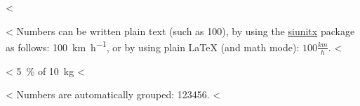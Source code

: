 <%

<%
Numbers can be written plain text (such as 100), by using the \href{https://ctan.org/pkg/siunitx}{siunitx} package as follows:
\SI{100}{\km\per\hour},
or by using plain \LaTeX{} (and math mode):
$100 \frac{\mathit{km}}{h}$.
<%

<%
\SI{5}{\percent} of \SI{10}{kg}
<%

<%
Numbers are automatically grouped: \num{123456}.
<%
